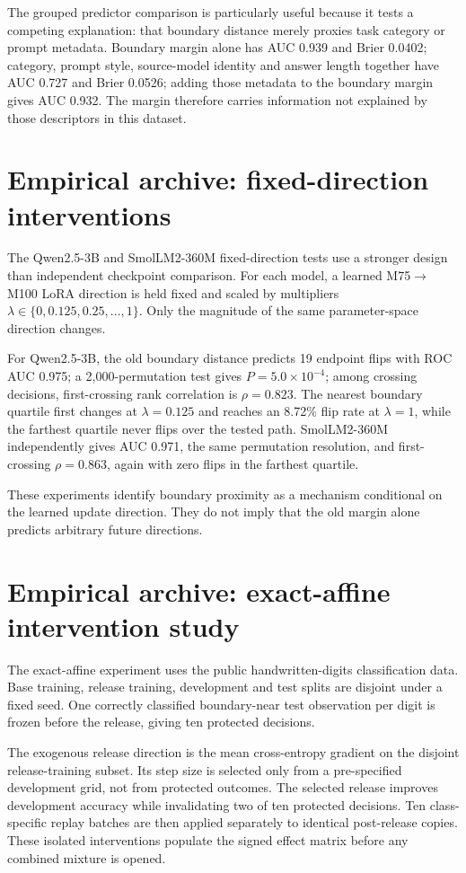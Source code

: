 \documentclass[11pt,letterpaper]{article}
\theoremstyle{plain}
\newcommand{\1}{\mathbf 1}
\begin{document}
The grouped predictor comparison is particularly useful because it tests a competing explanation: that boundary distance merely proxies task category or prompt metadata. Boundary margin alone has AUC 0.939 and Brier 0.0402; category, prompt style, source-model identity and answer length together have AUC 0.727 and Brier 0.0526; adding those metadata to the boundary margin gives AUC 0.932. The margin therefore carries information not explained by those descriptors in this dataset.

\section{Empirical archive: fixed-direction interventions}
The Qwen2.5-3B and SmolLM2-360M fixed-direction tests use a stronger design than independent checkpoint comparison. For each model, a learned M75$\to$M100 LoRA direction is held fixed and scaled by multipliers $\lambda\in\{0,0.125,0.25,\ldots,1\}$. Only the magnitude of the same parameter-space direction changes.

For Qwen2.5-3B, the old boundary distance predicts 19 endpoint flips with ROC AUC 0.975; a 2,000-permutation test gives $P=5.0\times10^{-4}$; among crossing decisions, first-crossing rank correlation is $\rho=0.823$. The nearest boundary quartile first changes at $\lambda=0.125$ and reaches an 8.72\% flip rate at $\lambda=1$, while the farthest quartile never flips over the tested path. SmolLM2-360M independently gives AUC 0.971, the same permutation resolution, and first-crossing $\rho=0.863$, again with zero flips in the farthest quartile.

These experiments identify boundary proximity as a mechanism conditional on the learned update direction. They do not imply that the old margin alone predicts arbitrary future directions.

\section{Empirical archive: exact-affine intervention study}
The exact-affine experiment uses the public handwritten-digits classification data. Base training, release training, development and test splits are disjoint under a fixed seed. One correctly classified boundary-near test observation per digit is frozen before the release, giving ten protected decisions.

The exogenous release direction is the mean cross-entropy gradient on the disjoint release-training subset. Its step size is selected only from a pre-specified development grid, not from protected outcomes. The selected release improves development accuracy while invalidating two of ten protected decisions. Ten class-specific replay batches are then applied separately to identical post-release copies. These isolated interventions populate the signed effect matrix before any combined mixture is opened.
\end{document}
